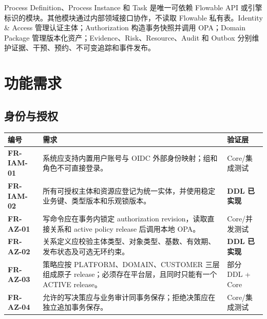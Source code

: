 \documentclass[journal,a4paper,onecolumn]{IEEEtran}
\newcommand{\req}[1]{\textbf{#1}}
\newcommand{\statusimpl}{\textbf{DDL 已实现}}
\begin{document}
Process Definition、Process Instance 和 Task 是唯一可依赖 Flowable API 或引擎标识的模块。其他模块通过内部领域接口协作，不读取 Flowable 私有表。Identity \& Access 管理认证主体；Authorization 构造事务快照并调用 OPA；Domain Package 管理版本化资产；Evidence、Risk、Resource、Audit 和 Outbox 分别维护证据、干预、预约、不可变追踪和事件发布。

\section{功能需求}
\subsection{身份与授权}
\begin{longtable}{p{}p{}p{}}
\toprule
编号 & 需求 & 验证层 \\
\midrule
\endhead
\req{FR-IAM-01} & 系统应支持内置用户账号与 OIDC 外部身份映射；组和角色不可直接登录。 & Core/集成测试\\
\req{FR-IAM-02} & 所有可授权主体和资源应登记为统一实体，并使用稳定业务键、类型版本和乐观锁版本。 & \statusimpl\\
\req{FR-AZ-01} & 写命令应在事务内锁定 authorization revision，读取直接关系和 active policy release 后调用本地 OPA。 & Core/并发测试\\
\req{FR-AZ-02} & 关系定义应校验主体类型、对象类型、基数、有效期、发布状态及可选无环约束。 & \statusimpl\\
\req{FR-AZ-03} & 策略应按 PLATFORM、DOMAIN、CUSTOMER 三层组成原子 release；必须存在平台层，且同时只能有一个 ACTIVE release。 & 部分 DDL + Core\\
\req{FR-AZ-04} & 允许的写决策应与业务审计同事务保存；拒绝决策应在独立追加事务保存。 & Core/集成测试\\
\bottomrule
\end{longtable}
\end{document}
